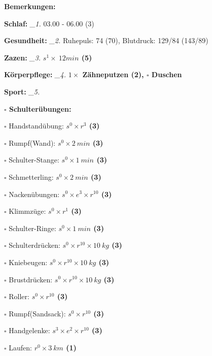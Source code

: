 \documentclass[10pt,a4paper]{article}
\newcommand\prop[1] {{\color {alizarin} {\bf #1}}}        %
\newcommand\draf[1] {{\color {amber(sae/ece)} {\bf #1}}}  %
\newcommand\mand[1] {{\color {burntorange} {\bf #1}}}     %
\newcommand\topspace{\vskip -15pt \hskip 20pt}
\newcommand\n[1] { {\sl #1.} \hskip 5pt }
\begin{document}
\begin{mdframed}[style=daystyle]
  \begin{labeling}{{\mand {Bemerkungen:}}}
    \setlength\itemsep{-3pt}
  \item[{\mand {Schlaf:}}]        \n{\_1} 03.00 - 06.00 (3)
  \item[{\mand {Gesundheit:}}]    \n{\_2} Ruhepuls: 74 (70), Blutdruck: 129/84 (143/89)
  \item[{\mand {Zazen:}}]         \n{\_3} {\draf {$s^1 \times\ 12 min$ (5)}}
  \item[{\mand {Körperpflege:}}]  \n{\_4} {\draf {$1 \times$ Zähneputzen (2), $\square$ Duschen}}
  \item[{\mand {Sport:}}]         \n{\_5}
    \topspace
    \begin{minipage}{0.75\textwidth}  
      \begin{labeling}{\prop {$\square$ {Schulterübungen:}}} 
        \setlength\itemsep{-3pt}
      \item[$\square$ Handstandübung:]  {\prop {$s^0 \times r^{3}$ (3)}}
      \item[$\square$ Rumpf(Wand):]     {\prop {$s^0 \times 2\ min$ (3)}}
      \item[$\square$ Schulter-Stange:] {\prop {$s^0 \times 1\ min$ (3)}}
      \item[$\square$ Schmetterling:]   {\prop {$s^0 \times 2\ min$ (3)}}
      \item[$\square$ Nackenübungen:]   {\prop {$s^0 \times e^3 \times r^{10}$ (3)}}
      \item[$\square$ Klimmzüge:]       {\prop {$s^0 \times r^1$ (3)}}
      \item[$\square$ Schulter-Ringe:]  {\prop {$s^0 \times 1\ min$ (3)}}
      \item[$\square$ Schulterdrücken:] {\prop {$s^0 \times r^{10} \times 10\ kg$ (3)}}
      \item[$\square$ Kniebeugen:]      {\prop {$s^0 \times r^{10} \times 10\ kg$ (3)}}
      \item[$\square$ Brustdrücken:]    {\prop {$s^0 \times r^{10} \times 10\ kg$ (3)}}
      \item[$\square$ Roller:]          {\prop {$s^0 \times r^{10}$ (3)}}
      \item[$\square$ Rumpf(Sandsack):] {\prop {$s^0 \times r^{10}$ (3)}}
      \item[$\square$ Handgelenke:]     {\prop {$s^3 \times e^2 \times r^{10}$ (3)}}
      \item[$\square$ Laufen:]          {\prop {$r^0 \times 3\ km$ (1)}}

\end{labeling}
\end{minipage}
\end{labeling}
\end{mdframed}
\end{document}
